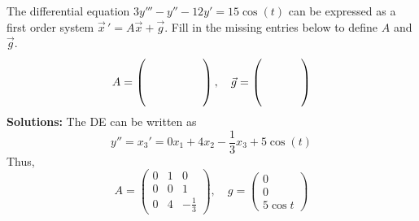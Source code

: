 \ifnum {}
\question[2] The differential equation $3y'''-y''-12y'=15\cos(t)$ can be expressed as a first order system $\vec x \, ' = A \vec x + \vec g$. Fill in the missing entries below to define $A$ and $\vec g$.  
 \begin{align*}
     A = \left( \hbox to 1.75cm{\vbox to 0.85cm{}} \right), \quad \vec g = \left( \hbox to 1.2cm{\vbox to 0.85cm{}} \right)
 \end{align*}  
 \ifnum {} {\color{DarkBlue} 
\textbf{Solutions:}
The DE can be written as
$$y'' = x_3 ' = 0x_1 +4x_2 - \frac13x_3 + 5\cos(t)$$
Thus,
$$A = \begin{pmatrix} 0&1&0\\0&0&1\\0&4&-\frac13\end{pmatrix}, \quad g = \begin{pmatrix} 0\\0\\ 5\cos t\end{pmatrix}$$
} 
\else 
\newpage
\fi
\fi 